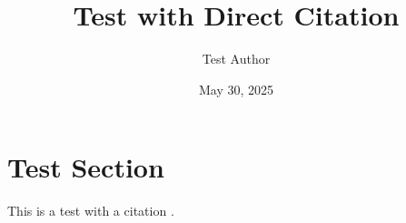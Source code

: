 \documentclass{article}
\title{Test with Direct Citation}
\author{Test Author}
\date{May 30, 2025}
\begin{document}
\maketitle

\section{Test Section}
This is a test with a citation \cite{Botvinick2001ConflictMonitoring}.



\end{document}
